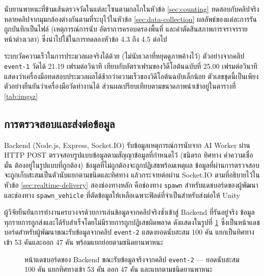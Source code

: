 นับยานพาหนะที่ข้ามเส้นตรวจวัดในแต่ละโซนตามกลไกในหัวข้อ \ref{sec:counting} ทดสอบกับคลิปจริงหลายคลิปจากมุมกล้องต่างกันตามที่ระบุไว้ในหัวข้อ \ref{sec:data-collection} ผลลัพธ์ของแต่ละการรันถูกบันทึกเป็นไฟล์ (เหตุการณ์การนับ อัตราการครอบครองพื้นที่ และคำตัดสินสภาพการจราจรรายหน้าต่างเวลา) ซึ่งนำไปใช้ในการทดลองหัวข้อ 4.3 ถึง 4.5 ต่อไป

ระบบวัดความเร็วในการประมวลผลจริงได้ด้วย (ไม่นับเวลาที่หยุดดูภาพค้างไว้) ตัวอย่างจากคลิป \texttt{event-1} วัดได้ 21.19 เฟรมต่อวินาที เทียบกับอัตราเฟรมของวิดีโอต้นฉบับที่ 25.00 เฟรมต่อวินาที แสดงว่าเครื่องมือทดสอบประมวลผลได้ช้ากว่าความเร็วของวิดีโอต้นฉบับเล็กน้อย ตัวเลขชุดนี้เป็นเพียงตัวอย่างยืนยันว่าเครื่องมือวัดทำงานได้ ส่วนผลเปรียบเทียบตามขนาดภาพนำเข้าอยู่ในตารางที่ \ref{tab:imgsz}

\subsection{การตรวจสอบและส่งต่อข้อมูล}
\label{subsec:proto-backend}

Backend (Node.js, Express, Socket.IO) รับข้อมูลเหตุการณ์การนับจาก AI Worker ผ่าน HTTP POST ตรวจสอบรูปแบบข้อมูลตามสัญญาข้อมูลที่กำหนดไว้ (ชนิดรถ ทิศทาง ค่าความเชื่อมั่น ต้องอยู่ในรูปแบบที่ถูกต้อง) ข้อมูลที่ไม่ถูกต้องจะถูกปฏิเสธพร้อมเหตุผล ข้อมูลที่ผ่านการตรวจสอบจะถูกเก็บสะสมเป็นตัวนับแยกตามชนิดและทิศทาง แล้วกระจายต่อผ่าน Socket.IO ตามที่อธิบายไว้ในหัวข้อ \ref{sec:realtime-delivery} สองช่องทางหลัก คือช่องทาง \texttt{spawn} สำหรับแดชบอร์ดของผู้พัฒนา และช่องทาง \texttt{spawn\_vehicle} ที่ตัดข้อมูลให้เหลือเฉพาะฟิลด์ที่จำเป็นสำหรับส่งต่อให้ Unity

ผู้วิจัยยืนยันการทำงานครบวงจรด้วยการเล่นข้อมูลจากคลิปจริงซ้ำเข้าสู่ Backend ที่รันอยู่จริง ข้อมูลทุกรายการถูกส่งและได้รับสำเร็จโดยไม่มีรายการถูกปฏิเสธผิดพลาด ดังแสดงในรูปที่ \ref{fig:dashboard-overview} ซึ่งเป็นหน้าแดชบอร์ดสำหรับผู้พัฒนาขณะรับข้อมูลจากคลิป \texttt{event-2} แสดงยอดนับสะสม 100 คัน แยกเป็นทิศทางเข้า 53 คันและออก 47 คัน พร้อมแยกย่อยตามชนิดยานพาหนะ

\begin{figure}[ht]
\centering
\caption{หน้าแดชบอร์ดของ Backend ขณะรับข้อมูลจริงจากคลิป \texttt{event-2} — ยอดนับสะสม 100 คัน แยกทิศทางเข้า 53 คัน ออก 47 คัน และแยกตามชนิดยานพาหนะ}
\label{fig:dashboard-overview}
\end{figure}

